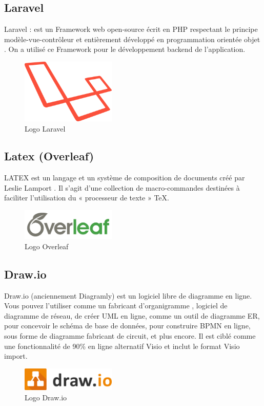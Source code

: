 \documentclass[a4paper,10pt]{book}
\begin{document}
\subsection{Laravel }
          Laravel : est un Framework web open-source écrit en PHP respectant le principe modèle-vue-contrôleur et entièrement développé en programmation orientée objet \cite{laravel}. On a utilisé ce Framework pour le développement backend de l’application. 
          
          
 \begin{figure}[!h]
\centering 
\includegraphics[width=0.4\textwidth]{LaravelLogo.png}
\caption{Logo Laravel }
\end{figure}

\subsection{Latex (Overleaf) }
LATEX est un langage et un système de composition de documents créé par Leslie Lamport \cite{latex} . Il s'agit d'une collection de macro-commandes destinées à faciliter l'utilisation du « processeur de texte » TeX.
\begin{figure}[!h]
\centering 
\includegraphics[width=0.4\textwidth]{latex.png}
\caption{Logo Overleaf }
\end{figure}
\subsection{Draw.io}
Draw.io (anciennement Diagramly) est un logiciel libre de diagramme en ligne. Vous pouvez l'utiliser comme un fabricant d'organigramme \cite{drawio}, logiciel de diagramme de réseau, de créer UML en ligne, comme un outil de diagramme ER, pour concevoir le schéma de base de données, pour construire BPMN en ligne, sous forme de diagramme fabricant de circuit, et plus encore. Il est ciblé comme une fonctionnalité de 90\% en ligne alternatif Visio et inclut le format Visio import.
\begin{figure}[!h]
\centering 
\includegraphics[width=0.4\textwidth]{drawio.png}
\caption{Logo Draw.io }
\end{figure}
\end{document}
